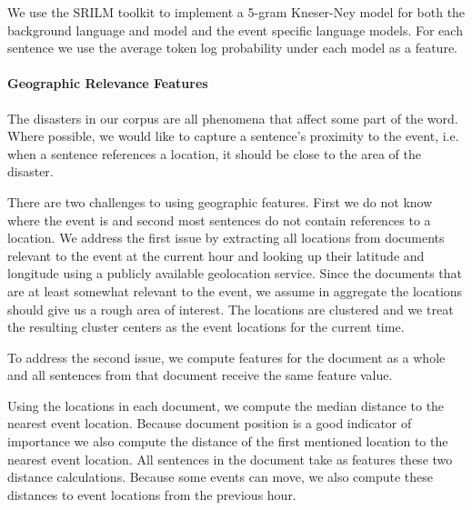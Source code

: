 We use the SRILM toolkit \cite{stolcke2002srilm} to implement a 5-gram Kneser-Ney model for both
the background language and model and the event specific language models.
For each sentence we use the average token log probability under each model
as a feature.




\paragraph{Geographic Relevance Features}
The disasters in our corpus are all phenomena that
affect some part of the word. 
Where possible, we would like to capture a sentence's proximity to the event,
i.e. when a sentence references a location, it should be close to the 
area of the disaster. 

There are two challenges to using geographic features. First we do not 
know where the event is and second most sentences do not contain references
to a location.
We address the first issue by extracting all locations from 
documents relevant to the event at the
current hour and looking up their latitude and 
longitude using a publicly available geolocation service. 
Since the documents that are at least somewhat relevant to the event,
we assume in aggregate the locations should give us a rough area of interest.
The locations are clustered %
and we treat the resulting cluster centers
as the event locations for the current time.


To address the second issue, 
we compute features for the document as a whole and all
sentences from that document receive the same feature value.

Using the locations in each document, we compute the median distance to the 
nearest event location. Because document position is a good indicator 
of importance we also compute the distance of the first mentioned
location to the nearest event location. All sentences in the document take
as features these two distance calculations.
Because some events can move, we also
compute these distances to event locations from the previous hour.



